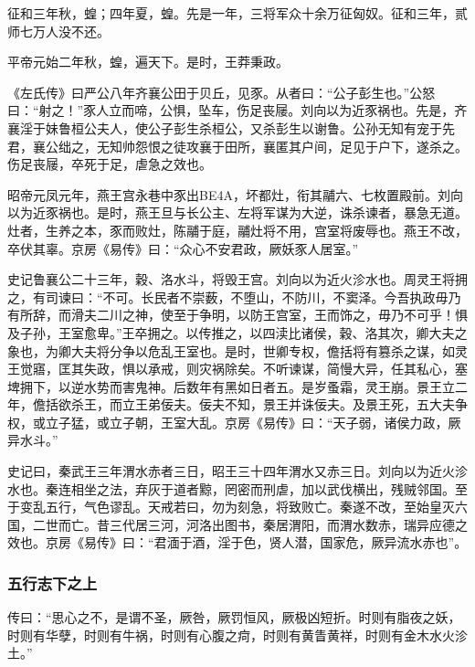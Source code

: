 \documentclass[]{article}
\begin{document}
征和三年秋，蝗；四年夏，蝗。先是一年，三将军众十余万征匈奴。征和三年，贰师七万人没不还。

平帝元始二年秋，蝗，遍天下。是时，王莽秉政。

《左氏传》曰严公八年齐襄公田于贝丘，见豕。从者曰：``公子彭生也。''公怒曰：``射之！''豕人立而啼，公惧，坠车，伤足丧屦。刘向以为近豕祸也。先是，齐襄淫于妹鲁桓公夫人，使公子彭生杀桓公，又杀彭生以谢鲁。公孙无知有宠于先君，襄公绌之，无知帅怨恨之徒攻襄于田所，襄匿其户间，足见于户下，遂杀之。伤足丧屦，卒死于足，虐急之效也。

昭帝元凤元年，燕王宫永巷中豕出BE4A，坏都灶，衔其鬴六、七枚置殿前。刘向以为近豕祸也。是时，燕王旦与长公主、左将军谋为大逆，诛杀谏者，暴急无道。灶者，生养之本，豕而败灶，陈鬴于庭，鬴灶将不用，宫室将废辱也。燕王不改，卒伏其辜。京房《易传》曰：``众心不安君政，厥妖豕人居室。''

史记鲁襄公二十三年，穀、洛水斗，将毁王宫。刘向以为近火沴水也。周灵王将拥之，有司谏曰：``不可。长民者不崇薮，不堕山，不防川，不窦泽。今吾执政毋乃有所辞，而滑夫二川之神，使至于争明，以防王宫室，王而饰之，毋乃不可乎！惧及子孙，王室愈卑。''王卒拥之。以传推之，以四渎比诸侯，穀、洛其次，卿大夫之象也，为卿大夫将分争以危乱王室也。是时，世卿专权，儋括将有篡杀之谋，如灵王觉寤，匡其失政，惧以承戒，则灾祸除矣。不听谏谋，简慢大异，任其私心，塞埤拥下，以逆水势而害鬼神。后数年有黑如日者五。是岁蚤霜，灵王崩。景王立二年，儋括欲杀王，而立王弟佞夫。佞夫不知，景王并诛佞夫。及景王死，五大夫争权，或立子猛，或立子朝，王室大乱。京房《易传》曰：``天子弱，诸侯力政，厥异水斗。''

史记曰，秦武王三年渭水赤者三日，昭王三十四年渭水又赤三日。刘向以为近火沴水也。秦连相坐之法，弃灰于道者黥，罔密而刑虐，加以武伐横出，残贼邻国。至于变乱五行，气色谬乱。天戒若曰，勿为刻急，将致败亡。秦遂不改，至始皇灭六国，二世而亡。昔三代居三河，河洛出图书，秦居渭阳，而渭水数赤，瑞异应德之效也。京房《易传》曰：``君湎于酒，淫于色，贤人潜，国家危，厥异流水赤也''。

\hypertarget{header-n2325}{%
\subsubsection{五行志下之上}\label{header-n2325}}

传曰：``思心之不，是谓不圣，厥咎，厥罚恒风，厥极凶短折。时则有脂夜之妖，时则有华孽，时则有牛祸，时则有心腹之疴，时则有黄眚黄祥，时则有金木水火沴土。''
\end{document}
